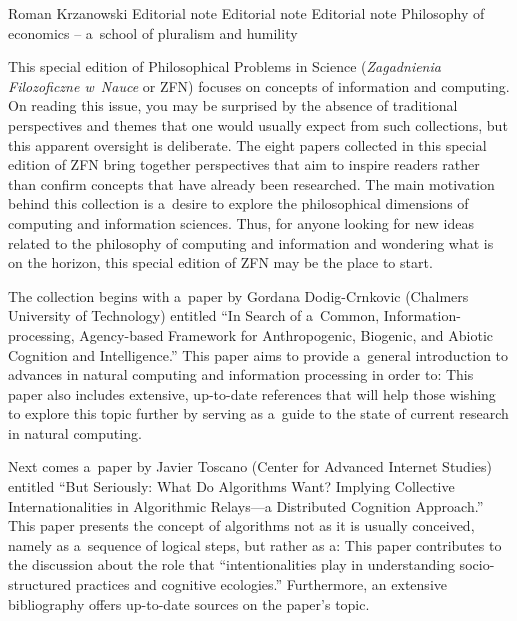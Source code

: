 
\begin{editorialeng}{Roman Krzanowski}
	{Editorial note}
	{Editorial note}
	{Editorial note}
	{Philosophy of economics -- a~school of pluralism and humility}


\lettrine[loversize=0.13,lines=2,lraise=-0.03,nindent=0em,findent=0.2pt]%
{T}{}his special edition of Philosophical Problems in Science (\textit{Zagadnienia Filozoficzne w~Nauce} or ZFN) focuses on concepts of information and computing. On reading this issue, you may be surprised by the absence of traditional perspectives and themes that one would usually expect from such collections, but this apparent oversight is deliberate. The eight papers collected in this special edition of ZFN bring together perspectives that aim to inspire readers rather than confirm concepts that have already been researched. The main motivation behind this collection is a~desire to explore the philosophical dimensions of computing and information sciences. Thus, for anyone looking for new ideas related to the philosophy of computing and information and wondering what is on the horizon, this special edition of ZFN may be the place to start.

The collection begins with a~paper by Gordana Dodig-Crnkovic (Chalmers University of Technology) entitled ``In Search of a~Common, Information-processing, Agency-based Framework for Anthropogenic, Biogenic, and Abiotic Cognition and Intelligence.'' This paper aims to provide a~general introduction to advances in natural computing and information processing in order to:
This paper also includes extensive, up-to-date references that will help those wishing to explore this topic further by serving as a~guide to the state of current research in natural computing.

Next comes a~paper by Javier Toscano (Center for Advanced Internet Studies) entitled ``But Seriously: What Do Algorithms Want? Implying Collective Internationalities in Algorithmic Relays---a Distributed Cognition Approach.'' This paper presents the concept of algorithms not as it is usually conceived, namely as a~sequence of logical steps, but rather as a:
This paper contributes to the discussion about the role that ``intentionalities play in understanding socio-structured practices and cognitive ecologies.'' Furthermore, an extensive bibliography offers up-to-date sources on the paper's topic.


\end{editorialeng}
